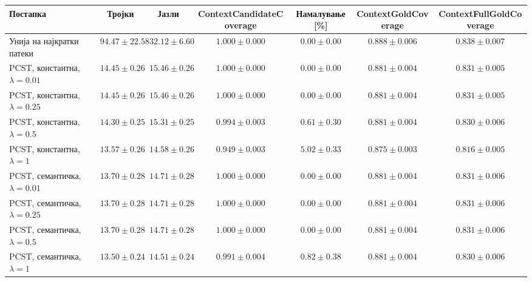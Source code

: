 \begin{tabular}{lcccccc}
\toprule
Постапка & Тројки & Јазли & ContextCandidateCoverage & Намалување [\%] & ContextGoldCoverage & ContextFullGoldCoverage \\
\midrule
Унија на најкратки патеки & $94.47 \pm 22.58$ & $32.12 \pm 6.60$ & $1.000 \pm 0.000$ & $0.00 \pm 0.00$ & $0.888 \pm 0.006$ & $0.838 \pm 0.007$ \\
PCST, константна, $\lambda=0.01$ & $14.45 \pm 0.26$ & $15.46 \pm 0.26$ & $1.000 \pm 0.000$ & $0.00 \pm 0.00$ & $0.881 \pm 0.004$ & $0.831 \pm 0.005$ \\
PCST, константна, $\lambda=0.25$ & $14.45 \pm 0.26$ & $15.46 \pm 0.26$ & $1.000 \pm 0.000$ & $0.00 \pm 0.00$ & $0.881 \pm 0.004$ & $0.831 \pm 0.005$ \\
PCST, константна, $\lambda=0.5$ & $14.30 \pm 0.25$ & $15.31 \pm 0.25$ & $0.994 \pm 0.003$ & $0.61 \pm 0.30$ & $0.881 \pm 0.004$ & $0.830 \pm 0.006$ \\
PCST, константна, $\lambda=1$ & $13.57 \pm 0.26$ & $14.58 \pm 0.26$ & $0.949 \pm 0.003$ & $5.02 \pm 0.33$ & $0.875 \pm 0.003$ & $0.816 \pm 0.005$ \\
PCST, семантичка, $\lambda=0.01$ & $13.70 \pm 0.28$ & $14.71 \pm 0.28$ & $1.000 \pm 0.000$ & $0.00 \pm 0.00$ & $0.881 \pm 0.004$ & $0.831 \pm 0.006$ \\
PCST, семантичка, $\lambda=0.25$ & $13.70 \pm 0.28$ & $14.71 \pm 0.28$ & $1.000 \pm 0.000$ & $0.00 \pm 0.00$ & $0.881 \pm 0.004$ & $0.831 \pm 0.006$ \\
PCST, семантичка, $\lambda=0.5$ & $13.70 \pm 0.28$ & $14.71 \pm 0.28$ & $1.000 \pm 0.000$ & $0.00 \pm 0.00$ & $0.881 \pm 0.004$ & $0.831 \pm 0.006$ \\
PCST, семантичка, $\lambda=1$ & $13.50 \pm 0.24$ & $14.51 \pm 0.24$ & $0.991 \pm 0.004$ & $0.82 \pm 0.38$ & $0.881 \pm 0.004$ & $0.830 \pm 0.006$ \\
\bottomrule
\end{tabular}
